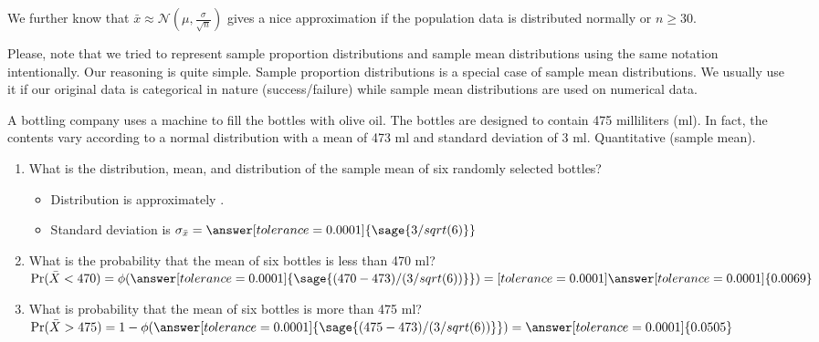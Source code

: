 \documentclass{ximera}
\begin{document}
We further know that $\bar x\approx \mathcal N(\mu,\frac{\sigma}{\sqrt{n}})$ gives a nice approximation if the population data is distributed normally or $n\geq 30$.

\begin{remark}
Please, note that we tried to represent sample proportion distributions and sample mean distributions using the same notation intentionally. Our reasoning is quite simple. Sample proportion distributions is a special case of sample mean distributions. We usually use it if our original data is categorical in nature (success/failure) while sample mean distributions are used on numerical data. 
\end{remark}

\begin{problem}
A bottling company uses a machine to fill the bottles with olive oil. The bottles are designed
to contain 475 milliliters (ml). In fact, the contents vary according to a normal distribution with
a mean of 473 ml and standard deviation of 3 ml. Quantitative (sample mean). 

    \begin{enumerate}
        \item What is the distribution, mean, and distribution of the sample mean of six randomly
selected bottles?

        \begin{itemize}
        \item Distribution is approximately .
        \item Standard deviation is $\sigma_{\bar x}=\answer[tolerance=0.0001]{\sage{3/sqrt(6)}}$
        \end{itemize}        
        
        \item  What is the probability that the mean of six bottles is less than 470 ml?
        $\Pr(\bar X<470)=\phi(\answer[tolerance=0.0001]{\sage{(470-473)/(3/sqrt(6))}})=[tolerance=0.0001]\answer[tolerance=0.0001]{0.0069}$
        \item  What is probability that the mean of six bottles is more than 475 ml?
        $\Pr(\bar X>475)=1-\phi(\answer[tolerance=0.0001]{\sage{(475-473)/(3/sqrt(6))}})=\answer[tolerance=0.0001]{0.0505}$
    \end{enumerate}
\end{problem}
\end{document}
